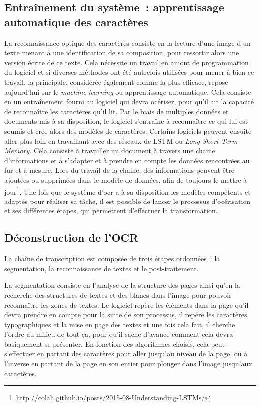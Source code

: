 \subsection{Entraînement du système~: apprentissage automatique des caractères}
La reconnaissance optique des caractères consiste en la lecture d'une image d'un texte menant à une identification de sa composition, pour ressortir alors une version écrite de ce texte. Cela nécessite un travail en amont de programmation du logiciel et si diverses méthodes ont été autrefois utilisées pour mener à bien ce travail, la principale, considérée également comme la plus efficace, repose aujourd'hui sur le \textit{machine learning} ou apprentissage automatique. Cela consiste en un entraînement fourni au logiciel qui devra océriser, pour qu'il ait la capacité de reconnaître les caractères qu'il lit. Par le biais de multiples données et documents mis à sa disposition, le logiciel s'entraîne à reconnaître ce qui lui est soumis et crée alors des modèles de caractères. 
Certains logiciels peuvent ensuite aller plus loin en travaillant avec des réseaux de LSTM ou \textit{Long Short-Term Memory}. Cela consiste à travailler un document à travers une chaine d’informations et à s’adapter et à prendre en compte les données rencontrées au fur et à mesure. Lors du travail de la chaine, des informations peuvent être ajoutées ou supprimées dans le modèle de données, afin de toujours le mettre à jour\footnote{\url{http://colah.github.io/posts/2015-08-Understanding-LSTMs/}}. Une fois que le système d'\acrshort{ocr} a à sa disposition les modèles compétents et adaptés pour réaliser sa tâche, il est possible de lancer le processus d'océrisation et ses différentes étapes, qui permettent d'effectuer la transformation.


\subsection{Déconstruction de l'OCR}
La chaîne de transcription est composée de trois étapes ordonnées~: la segmentation, la reconnaissance de textes et le post-traitement. 

La segmentation consiste en l'analyse de la structure des pages ainsi qu'en la recherche des structures de textes et des blancs dans l'image pour pouvoir reconnaître les zones de textes. Le logiciel repère les éléments dans la page qu'il devra prendre en compte pour la suite de son processus, il repère les caractères typographiques et la mise en page des textes et une fois cela fait, il cherche l'ordre au milieu de tout ça, pour qu'il sache d'avance comment cela devra basiquement se présenter. En fonction des algorithmes choisis, cela peut s'effectuer en partant des caractères pour aller jusqu'au niveau de la page, ou à l'inverse en partant de la page en son entier pour plonger dans l'image jusqu'aux caractères. 

